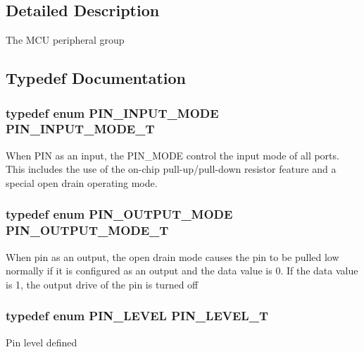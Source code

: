 \subsection{Detailed Description}
The M\-C\-U peripheral group 

\subsection{Typedef Documentation}
\hypertarget{group___peripheral_gad5705547b72a4480dc714447b3bbfb64}{
\subsubsection[{P\-I\-N\-\_\-\-I\-N\-P\-U\-T\-\_\-\-M\-O\-D\-E\-\_\-\-T}]{\setlength{\rightskip}{0pt plus 5cm}typedef enum {\bf P\-I\-N\-\_\-\-I\-N\-P\-U\-T\-\_\-\-M\-O\-D\-E} {\bf P\-I\-N\-\_\-\-I\-N\-P\-U\-T\-\_\-\-M\-O\-D\-E\-\_\-\-T}}}\label{group___peripheral_gad5705547b72a4480dc714447b3bbfb64}
When P\-I\-N as an input, the P\-I\-N\-\_\-\-M\-O\-D\-E control the input mode of all ports. This includes the use of the on-\/chip pull-\/up/pull-\/down resistor feature and a special open drain operating mode. \hypertarget{group___peripheral_ga29412fef1d1b9fafc0cd270a5d702f28}{
\subsubsection[{P\-I\-N\-\_\-\-O\-U\-T\-P\-U\-T\-\_\-\-M\-O\-D\-E\-\_\-\-T}]{\setlength{\rightskip}{0pt plus 5cm}typedef enum {\bf P\-I\-N\-\_\-\-O\-U\-T\-P\-U\-T\-\_\-\-M\-O\-D\-E} {\bf P\-I\-N\-\_\-\-O\-U\-T\-P\-U\-T\-\_\-\-M\-O\-D\-E\-\_\-\-T}}}\label{group___peripheral_ga29412fef1d1b9fafc0cd270a5d702f28}
When pin as an output, the open drain mode causes the pin to be pulled low normally if it is configured as an output and the data value is 0. If the data value is 1, the output drive of the pin is turned off \hypertarget{group___peripheral_gac4a9005971c102914017b5e21ae23a19}{
\subsubsection[{P\-I\-N\-\_\-\-L\-E\-V\-E\-L\-\_\-\-T}]{\setlength{\rightskip}{0pt plus 5cm}typedef enum {\bf P\-I\-N\-\_\-\-L\-E\-V\-E\-L} {\bf P\-I\-N\-\_\-\-L\-E\-V\-E\-L\-\_\-\-T}}}\label{group___peripheral_gac4a9005971c102914017b5e21ae23a19}
Pin level defined 


